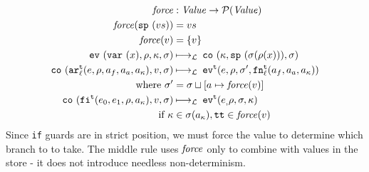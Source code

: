 \documentclass[preprint,onecolumn,9pt]{sigplanconf} %
\begin{document}
\begin{align*}
\spchoice
{\force &: \Store \times \Value \to \Set(\Value) \\
 \force(\msto,\saddr{\maddr}) &= \msto(\maddr) \\
 \force(\mval) &= \{\mval\}}
{\force &: \Value \to \Set(\Value) \\
 \force(\superposition{\mval{s}}) &= \mval{s} \\
 \force(\mval) &= \{\mval\}}
\\
%
\ev{\svar{\mvar},\menv,\mkont,\msto} &\lmachstep\;
\spchoice
{\co{\mkont,\saddr{\menv(\mvar)},\msto}}
{\co{\mkont,\superposition{\msto(\menv(\mvar))},\msto}} \\
%
\co{\kar[^\mcntr_\mlab]{\mexp,\menv,\maddr_f,\maddr_a,\maddr_\mkont},\mval,\msto}
&\lmachstep\;
\ev[^\mcntr]{\mexp,\menv,\msto',\kfn[^\mcntr_\mlab]{\maddr_f,\maddr_a,\maddr_\mkont}} \\
\text{ where }
\msto' &=
\spchoice
{\msto \sqcup[\maddr \mapsto \force(\msto,\mval)]}
{\msto \sqcup[\maddr \mapsto \force(\mval)]} \\
%
\co{\kif[^\mcntr]{\mexpi0,\mexpi1,\menv,\maddr_\mkont},\mval,\msto}
&\lmachstep\;
\ev[^\mcntr]{\mexpi,\menv,\msto,\mkont} \\
\text{ if } \mkont &\in \msto(\maddr_\mkont),
            \strue \in \spchoice{\force(\msto,\mval)}{\force(\mval)}
\end{align*}
Since {\tt if} guards are in strict position, we must force the value
to determine which branch to to take. The middle rule uses $\mathit{force}$
only to combine with values in the store - it does not introduce
needless non-determinism.
\end{document}
